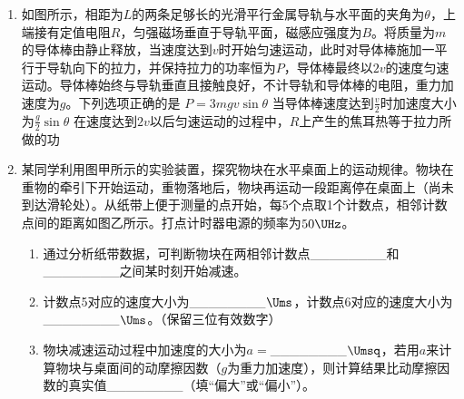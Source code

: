 \documentclass[\gkver]{gaokaozhenti}
\begin{document}
\begin{enumerate}
\item
如图所示，相距为$L$的两条足够长的光滑平行金属导轨与水平面的夹角为$\theta$，上端接有定值电阻$R$，匀强磁场垂直于导轨平面，磁感应强度为$B$。将质量为$m$的导体棒由静止释放，当速度达到$v$时开始匀速运动，此时对导体棒施加一平行于导轨向下的拉力，并保持拉力的功率恒为$P$，导体棒最终以$2v$的速度匀速运动。导体棒始终与导轨垂直且接触良好，不计导轨和导体棒的电阻，重力加速度为$g$。下列选项正确的是
{$P=3mgv\sin\theta$}
{当导体棒速度达到$\frac{v}{2}$时加速度大小为$\frac{g}{2}\sin\theta$}
{在速度达到$2v$以后匀速运动的过程中，$R$上产生的焦耳热等于拉力所做的功}

\item
某同学利用图甲所示的实验装置，探究物块在水平桌面上的运动规律。物块在重物的牵引下开始运动，重物落地后，物块再运动一段距离停在桌面上（尚未到达滑轮处）。从纸带上便于测量的点开始，每5个点取1个计数点，相邻计数点间的距离如图乙所示。打点计时器电源的频率为$50\UHz$。
\begin{enumerate}
	\item
	通过分析纸带数据，可判断物块在两相邻计数点\_\_\_\_\_\_\_\_和\_\_\_\_\_\_\_\_之间某时刻开始减速。
	\item
	计数点5对应的速度大小为\_\_\_\_\_\_\_\_$\Ums$，计数点6对应的速度大小为\_\_\_\_\_\_\_\_$\Ums$。（保留三位有效数字）
	\item
	物块减速运动过程中加速度的大小为$a=$\_\_\_\_\_\_\_\_$\Umsq$，若用$a$来计算物块与桌面间的动摩擦因数（$g$为重力加速度），则计算结果比动摩擦因数的真实值\_\_\_\_\_\_\_\_（填“偏大”或“偏小”）。
\end{enumerate}
\end{enumerate}
\end{document}
